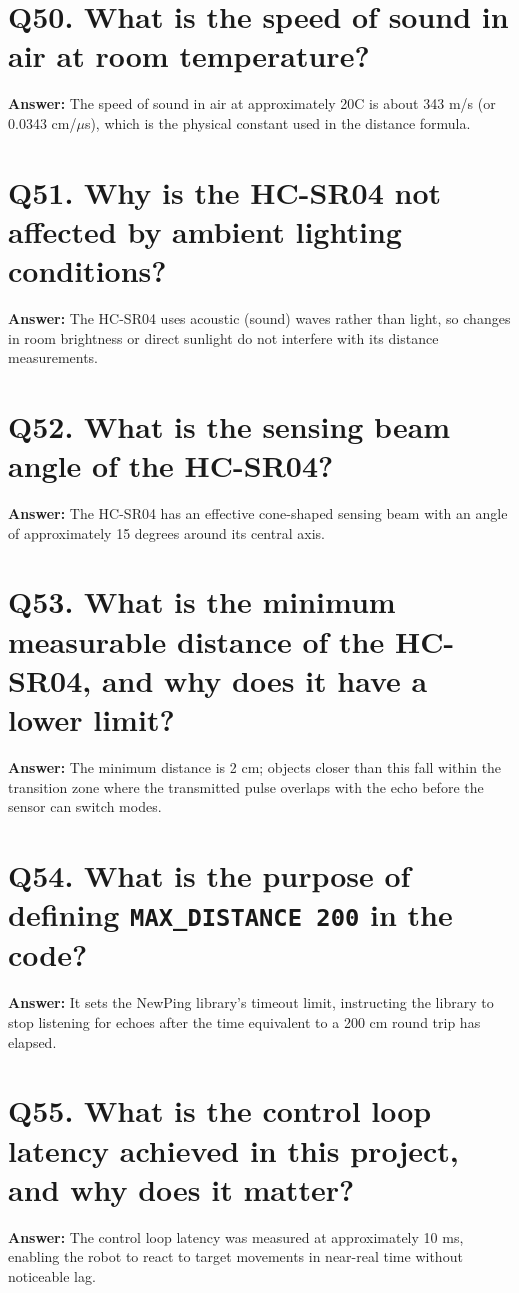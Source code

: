 \documentclass[12pt,a4paper,oneside]{report}
\begin{document}
\section{Q50. What is the speed of sound in air at room temperature?}
\textbf{Answer:} The speed of sound in air at approximately 20\textdegree{}C is about 343 m/s (or 0.0343 cm/$\mu$s), which is the physical constant used in the distance formula.

\section{Q51. Why is the HC-SR04 not affected by ambient lighting conditions?}
\textbf{Answer:} The HC-SR04 uses acoustic (sound) waves rather than light, so changes in room brightness or direct sunlight do not interfere with its distance measurements.

\section{Q52. What is the sensing beam angle of the HC-SR04?}
\textbf{Answer:} The HC-SR04 has an effective cone-shaped sensing beam with an angle of approximately 15 degrees around its central axis.

\section{Q53. What is the minimum measurable distance of the HC-SR04, and why does it have a lower limit?}
\textbf{Answer:} The minimum distance is 2 cm; objects closer than this fall within the transition zone where the transmitted pulse overlaps with the echo before the sensor can switch modes.

\section{Q54. What is the purpose of defining \texttt{MAX\_DISTANCE 200} in the code?}
\textbf{Answer:} It sets the NewPing library's timeout limit, instructing the library to stop listening for echoes after the time equivalent to a 200 cm round trip has elapsed.

\section{Q55. What is the control loop latency achieved in this project, and why does it matter?}
\textbf{Answer:} The control loop latency was measured at approximately 10 ms, enabling the robot to react to target movements in near-real time without noticeable lag.
\end{document}
